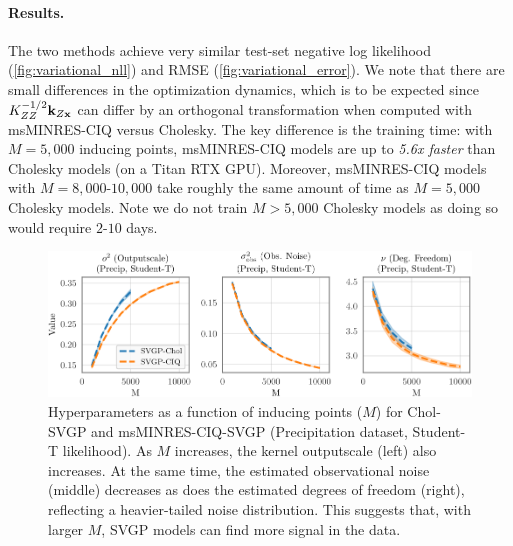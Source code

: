 \paragraph{Results.}
The two methods achieve very similar test-set negative log likelihood (\cref{fig:variational_nll}) and RMSE (\cref{fig:variational_error}).
We note that there are small
differences in the optimization dynamics, which is to be expected since $K_{ZZ}^{-1/2} \mathbf{k}_{Z\mathbf{x}}$ can differ by an orthogonal
transformation when computed with msMINRES-CIQ versus Cholesky.
The key difference is the training time:
with $M=5,\!000$ inducing points, msMINRES-CIQ models are up to \emph{5.6x faster} than Cholesky models (on a Titan RTX GPU).
Moreover, msMINRES-CIQ models with $M=8,\!000$-$10,\!000$ take roughly the same amount of time as $M=5,\!000$ Cholesky models.
Note we do not train $M > 5,\!000$ Cholesky models as doing so would require $2$-$10$ days.

\begin{figure}[t!]
  \centering
  \includegraphics[width=\linewidth]{figures/variational_stats.pdf}
  \caption[Hyperparameters of Cholesky and CIQ SVGP models.]{
    Hyperparameters as a function of inducing points ($M$) for Chol-SVGP and msMINRES-CIQ-SVGP (Precipitation dataset, Student-T likelihood).
    As $M$ increases, the kernel outputscale (left) also increases.
    At the same time, the estimated observational noise (middle) decreases as does the estimated degrees of freedom (right), reflecting a heavier-tailed noise distribution.
    This suggests that, with larger $M$, SVGP models can find more signal in the data.
  }
  \label{fig:variational_stats}
\end{figure}

